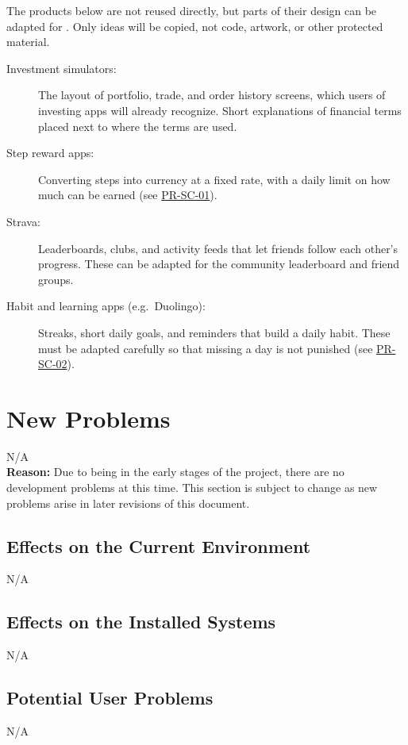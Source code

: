 \documentclass[12pt]{article}
\begin{document}
The products below are not reused directly, but parts of their design can be
adapted for \progname{}. Only ideas will be copied, not code, artwork, or other
protected material.

\begin{description}
  \item[Investment simulators:] The layout of portfolio, trade, and order
  history screens, which users of investing apps will already recognize. Short
  explanations of financial terms placed next to where the terms are used.

  \item[Step reward apps:] Converting steps into currency at a fixed rate, with
  a daily limit on how much can be earned (see \hyperlink{req:PR-SC-01}{PR-SC-01}).

  \item[Strava:] Leaderboards, clubs, and activity feeds that let friends
  follow each other's progress. These can be adapted for the community
  leaderboard and friend groups.

  \item[Habit and learning apps (e.g.\ Duolingo):] Streaks, short daily goals,
  and reminders that build a daily habit. These must be adapted carefully so
  that missing a day is not punished (see \hyperlink{req:PR-SC-02}{PR-SC-02}).
\end{description}

\section{New Problems}
\noindent N/A \\
\textbf{Reason:} Due to being in the early stages of the project, there are no development problems at this time. This section is subject to change as new problems arise in later revisions of this document. \\

\subsection{Effects on the Current Environment}
\noindent N/A

\subsection{Effects on the Installed Systems}
\noindent N/A

\subsection{Potential User Problems}
\noindent N/A
\end{document}
